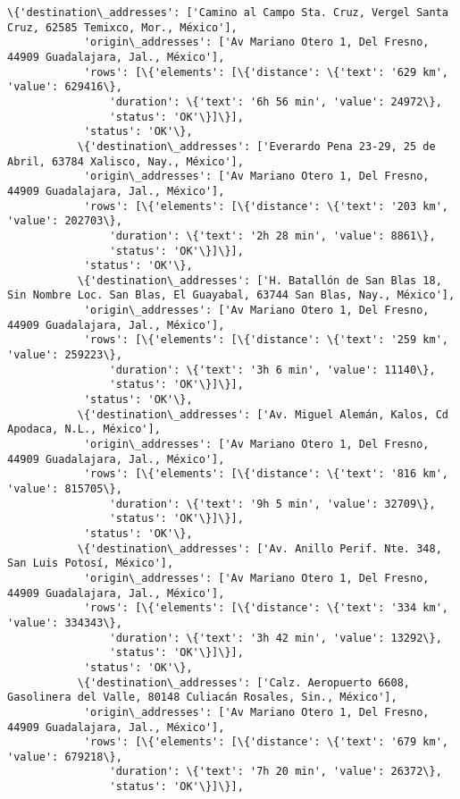 \documentclass[11pt]{article}
\begin{document}
\begin{Verbatim}[commandchars=\\\{\}]
           \{'destination\_addresses': ['Camino al Campo Sta. Cruz, Vergel Santa Cruz, 62585 Temixco, Mor., México'],
            'origin\_addresses': ['Av Mariano Otero 1, Del Fresno, 44909 Guadalajara, Jal., México'],
            'rows': [\{'elements': [\{'distance': \{'text': '629 km', 'value': 629416\},
                'duration': \{'text': '6h 56 min', 'value': 24972\},
                'status': 'OK'\}]\}],
            'status': 'OK'\},
           \{'destination\_addresses': ['Everardo Pena 23-29, 25 de Abril, 63784 Xalisco, Nay., México'],
            'origin\_addresses': ['Av Mariano Otero 1, Del Fresno, 44909 Guadalajara, Jal., México'],
            'rows': [\{'elements': [\{'distance': \{'text': '203 km', 'value': 202703\},
                'duration': \{'text': '2h 28 min', 'value': 8861\},
                'status': 'OK'\}]\}],
            'status': 'OK'\},
           \{'destination\_addresses': ['H. Batallón de San Blas 18, Sin Nombre Loc. San Blas, El Guayabal, 63744 San Blas, Nay., México'],
            'origin\_addresses': ['Av Mariano Otero 1, Del Fresno, 44909 Guadalajara, Jal., México'],
            'rows': [\{'elements': [\{'distance': \{'text': '259 km', 'value': 259223\},
                'duration': \{'text': '3h 6 min', 'value': 11140\},
                'status': 'OK'\}]\}],
            'status': 'OK'\},
           \{'destination\_addresses': ['Av. Miguel Alemán, Kalos, Cd Apodaca, N.L., México'],
            'origin\_addresses': ['Av Mariano Otero 1, Del Fresno, 44909 Guadalajara, Jal., México'],
            'rows': [\{'elements': [\{'distance': \{'text': '816 km', 'value': 815705\},
                'duration': \{'text': '9h 5 min', 'value': 32709\},
                'status': 'OK'\}]\}],
            'status': 'OK'\},
           \{'destination\_addresses': ['Av. Anillo Perif. Nte. 348, San Luis Potosí, México'],
            'origin\_addresses': ['Av Mariano Otero 1, Del Fresno, 44909 Guadalajara, Jal., México'],
            'rows': [\{'elements': [\{'distance': \{'text': '334 km', 'value': 334343\},
                'duration': \{'text': '3h 42 min', 'value': 13292\},
                'status': 'OK'\}]\}],
            'status': 'OK'\},
           \{'destination\_addresses': ['Calz. Aeropuerto 6608, Gasolinera del Valle, 80148 Culiacán Rosales, Sin., México'],
            'origin\_addresses': ['Av Mariano Otero 1, Del Fresno, 44909 Guadalajara, Jal., México'],
            'rows': [\{'elements': [\{'distance': \{'text': '679 km', 'value': 679218\},
                'duration': \{'text': '7h 20 min', 'value': 26372\},
                'status': 'OK'\}]\}],

\end{Verbatim}
\end{document}
